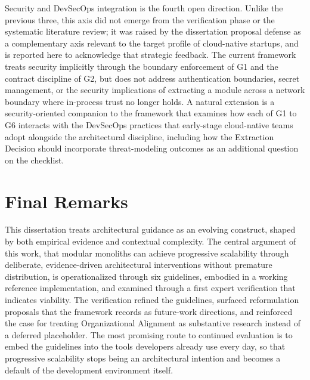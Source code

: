 Security and DevSecOps integration is the fourth open direction. Unlike the previous three, this axis did not emerge from the verification phase or the systematic literature review; it was raised by the dissertation proposal defense as a complementary axis relevant to the target profile of cloud-native startups, and is reported here to acknowledge that strategic feedback. The current framework treats security implicitly through the boundary enforcement of G1 and the contract discipline of G2, but does not address authentication boundaries, secret management, or the security implications of extracting a module across a network boundary where in-process trust no longer holds. A natural extension is a security-oriented companion to the framework that examines how each of G1 to G6 interacts with the DevSecOps practices that early-stage cloud-native teams adopt alongside the architectural discipline, including how the Extraction Decision should incorporate threat-modeling outcomes as an additional question on the checklist.

\section{Final Remarks}

This dissertation treats architectural guidance as an evolving construct, shaped by both empirical evidence and contextual complexity. The central argument of this work, that modular monoliths can achieve progressive scalability through deliberate, evidence-driven architectural interventions without premature distribution, is operationalized through six guidelines, embodied in a working reference implementation, and examined through a first expert verification that indicates viability. The verification refined the guidelines, surfaced reformulation proposals that the framework records as future-work directions, and reinforced the case for treating Organizational Alignment as substantive research instead of a deferred placeholder. The most promising route to continued evaluation is to embed the guidelines into the tools developers already use every day, so that progressive scalability stops being an architectural intention and becomes a default of the development environment itself.
